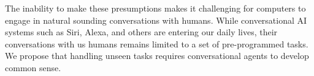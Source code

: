 The inability to make these presumptions makes it challenging 
for computers to engage in natural sounding conversations with humans. While conversational AI systems such as Siri, Alexa, and others are entering our daily lives, their conversations with us humans remains limited to a set of pre-programmed tasks.
We propose that handling unseen tasks requires conversational agents to develop common sense. %

